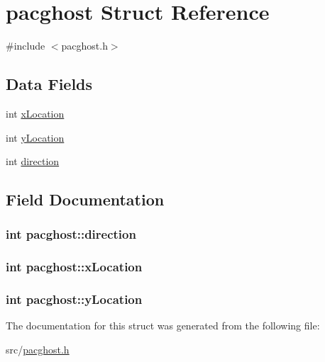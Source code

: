 \hypertarget{structpacghost}{\section{pacghost Struct Reference}
\label{structpacghost}
}


{\ttfamily \#include $<$pacghost.\-h$>$}

\subsection*{Data Fields}
\begin{DoxyCompactItemize}
\item 
int \hyperlink{structpacghost_a9278e575a0bbc4165d750a9b70ce66aa}{x\-Location}
\item 
int \hyperlink{structpacghost_a935a41a99808cc733ddd5273f4cc2669}{y\-Location}
\item 
int \hyperlink{structpacghost_a82ad02d20195a44e6482e8c0eead1ca7}{direction}
\end{DoxyCompactItemize}


\subsection{Field Documentation}
\hypertarget{structpacghost_a82ad02d20195a44e6482e8c0eead1ca7}{
\subsubsection[{direction}]{\setlength{\rightskip}{0pt plus 5cm}int pacghost\-::direction}}\label{structpacghost_a82ad02d20195a44e6482e8c0eead1ca7}
\hypertarget{structpacghost_a9278e575a0bbc4165d750a9b70ce66aa}{
\subsubsection[{x\-Location}]{\setlength{\rightskip}{0pt plus 5cm}int pacghost\-::x\-Location}}\label{structpacghost_a9278e575a0bbc4165d750a9b70ce66aa}
\hypertarget{structpacghost_a935a41a99808cc733ddd5273f4cc2669}{
\subsubsection[{y\-Location}]{\setlength{\rightskip}{0pt plus 5cm}int pacghost\-::y\-Location}}\label{structpacghost_a935a41a99808cc733ddd5273f4cc2669}


The documentation for this struct was generated from the following file\-:\begin{DoxyCompactItemize}
\item 
src/\hyperlink{src_2pacghost_8h}{pacghost.\-h}\end{DoxyCompactItemize}
